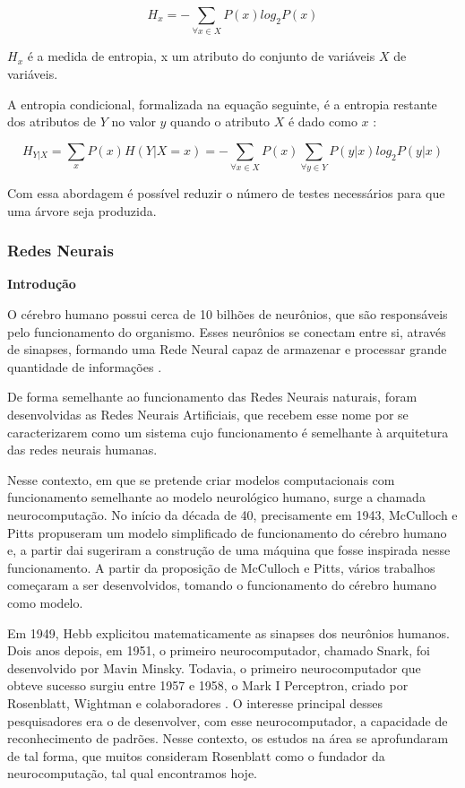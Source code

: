 \begin{equation}
H_{x}=-\sum_{\forall x \in X}P(x)log_{2}P(x)
\end{equation}

$ H_{x} $ é a medida de entropia, x um atributo do conjunto de variáveis $X$ de variáveis. 

A entropia condicional, formalizada na equação seguinte, é a entropia restante dos atributos de $Y$ no valor $y$ quando o atributo $X$ é dado como $x$ \cite{DecisionTree}:

\begin{equation}
H_{Y|X}= \sum_{x}P(x)H(Y|X=x) =-\sum_{\forall x \in X}P(x) \sum_{\forall y \in Y}P(y|x)log_{2}P(y|x)
\end{equation}

Com essa abordagem é possível reduzir o número de testes necessários para que uma árvore seja produzida.

\pagebreak

\subsubsection{Redes Neurais}

\textbf{Introdução}

O cérebro humano possui cerca de 10 bilhões de neurônios, que são responsáveis pelo funcionamento do organismo. 
Esses neurônios se conectam entre si, através de sinapses, formando uma Rede Neural capaz de armazenar e processar grande quantidade de informações \cite{NorvigRussel2004}.

De forma semelhante ao funcionamento das Redes Neurais naturais, foram desenvolvidas as Redes Neurais Artificiais, que recebem esse nome por se caracterizarem como um 
sistema cujo funcionamento é semelhante à arquitetura das redes neurais humanas.

Nesse contexto, em que se pretende criar modelos computacionais com funcionamento semelhante ao modelo neurológico humano, surge a chamada neurocomputação. 
No início da década de 40, precisamente em 1943, McCulloch e Pitts \cite{Heaton2008} propuseram um modelo simplificado de funcionamento do cérebro humano e, 
a partir dai sugeriram a construção de uma máquina que fosse inspirada nesse funcionamento. A partir da proposição de McCulloch e Pitts, vários trabalhos começaram a ser desenvolvidos, tomando o funcionamento do cérebro humano como modelo. 

Em 1949, Hebb explicitou matematicamente as sinapses dos neurônios humanos. Dois anos depois, em 1951, o primeiro neurocomputador, 
chamado Snark, foi desenvolvido por Mavin Minsky. Todavia, o primeiro neurocomputador que obteve sucesso surgiu entre 1957 e 1958, 
o Mark I Perceptron, criado por Rosenblatt, Wightman e colaboradores \cite{Heaton2008}. O interesse principal desses pesquisadores era o de desenvolver, com esse neurocomputador, a capacidade de reconhecimento de padrões. Nesse contexto, os estudos na área se aprofundaram de tal forma, que muitos consideram Rosenblatt como o fundador da neurocomputação, tal qual encontramos hoje. 

